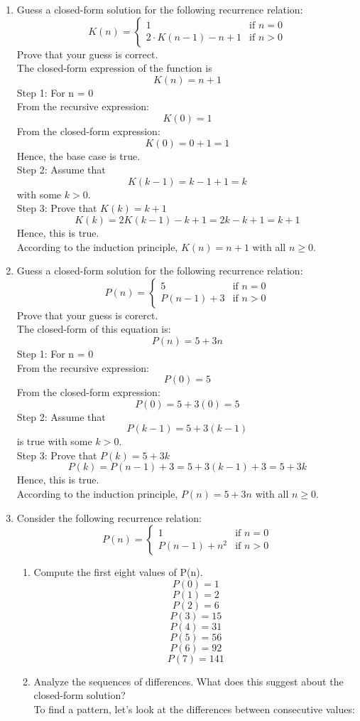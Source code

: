 \documentclass[12pt]{article}
\begin{document}
\begin{enumerate}
    \item Guess a closed-form solution for the following recurrence relation:
    \[
    K(n) = 
    \begin{cases}
    1 & \text{if } n = 0 \\
    2 \cdot K(n-1) - n + 1& \text{if } n > 0
    \end{cases}
    \]
    Prove that your guess is correct.\\
    The closed-form expression of the function is 
    \[K(n) = n + 1\]
    Step 1: For n = 0\\
    From the recursive expression:
    \[K(0) = 1\]
    From the closed-form expression:
    \[K(0) = 0 + 1= 1\]
    Hence, the base case is true.\\
    Step 2: Assume that
    \[K(k - 1) = k - 1 + 1 = k\]
    with some $k > 0$.\\
    Step 3: Prove that $K(k) = k + 1$
    \[K(k) = 2K(k-1) - k + 1 = 2k - k + 1 = k + 1\]
    Hence, this is true.\\
    According to the induction principle, $K(n) = n + 1$ with all $n \geq 0$.
    
    \item Guess a closed-form solution for the following recurrence relation:
    \[
    P(n) = 
    \begin{cases}
    5 & \text{if } n = 0 \\
    P(n-1) + 3& \text{if } n > 0
    \end{cases}
    \]
    Prove that your guess is corerct.\\
    The closed-form of this equation is:
    \[P(n) = 5 + 3n\]
    Step 1: For n = 0\\
    From the recursive expression:
    \[P(0) = 5\]
    From the closed-form expression:
    \[P(0) = 5 + 3(0) = 5\]
    Step 2: Assume that 
    \[P(k-1) = 5 + 3(k-1)\]
    is true with some $k > 0$.\\
    Step 3: Prove that $P(k) = 5 + 3k$
    \[P(k) = P(n-1) + 3 = 5 + 3(k-1) + 3 = 5 + 3k\]
    Hence, this is true.
    \\According to the induction principle, $P(n) = 5 + 3n$ with all $n \geq 0$.

    \item Consider the following recurrence relation:
    \[
    P(n) = 
    \begin{cases}
    1 & \text{if } n = 0 \\
    P(n-1) + n^2& \text{if } n > 0
    \end{cases}
    \]  
    \begin{enumerate}
        \item Compute the first eight values of P(n).
        \[P(0) = 1\]
        \[P(1) = 2\]
        \[P(2) = 6\]
        \[P(3) = 15\]
        \[P(4) = 31\]
        \[P(5) = 56\]
        \[P(6) = 92\]
        \[P(7) = 141\]
        \item Analyze the sequences of differences. What does this suggest about the closed-form solution?\\
        To find a pattern, let's look at the differences between consecutive values:


\end{enumerate}
\end{enumerate}
\end{document}
